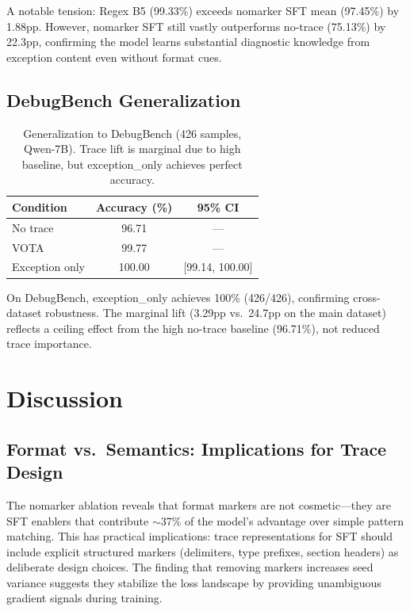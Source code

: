 \documentclass[11pt]{article}
\begin{document}
A notable tension: Regex B5 (99.33\%) exceeds nomarker SFT mean (97.45\%) by 1.88pp. However, nomarker SFT still vastly outperforms no-trace (75.13\%) by 22.3pp, confirming the model learns substantial diagnostic knowledge from exception content even without format cues.

\subsection{DebugBench Generalization}

\begin{table}[h]
\centering
\caption{Generalization to DebugBench (426 samples, Qwen-7B). Trace lift is marginal due to high baseline, but exception\_only achieves perfect accuracy.}
\label{tab:debugbench}
\small
\begin{tabular}{lcc}
\toprule
\textbf{Condition} & \textbf{Accuracy (\%)} & \textbf{95\% CI} \\
\midrule
No trace & 96.71 & --- \\
VOTA & 99.77 & --- \\
Exception only & 100.00 & [99.14, 100.00] \\
\bottomrule
\end{tabular}
\end{table}

On DebugBench, exception\_only achieves 100\% (426/426), confirming cross-dataset robustness. The marginal lift (3.29pp vs.\ 24.7pp on the main dataset) reflects a ceiling effect from the high no-trace baseline (96.71\%), not reduced trace importance.

\section{Discussion}

\subsection{Format vs.\ Semantics: Implications for Trace Design}

The nomarker ablation reveals that format markers are not cosmetic---they are SFT enablers that contribute $\sim$37\% of the model's advantage over simple pattern matching. This has practical implications: trace representations for SFT should include explicit structured markers (delimiters, type prefixes, section headers) as deliberate design choices. The finding that removing markers increases seed variance suggests they stabilize the loss landscape by providing unambiguous gradient signals during training.
\end{document}

